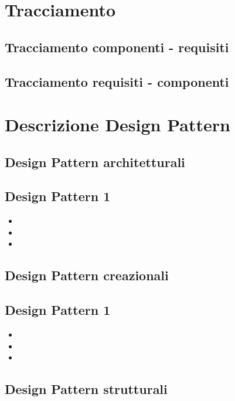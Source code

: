 \newpage
\section{Tracciamento} %
\subsection{Tracciamento componenti - requisiti} %
\subsection{Tracciamento requisiti - componenti} %

\newpage
\appendix
\section{Descrizione Design Pattern} %

\subsection{Design Pattern architetturali} %
\subsection{Design Pattern 1} %
\begin{itemize}
\item {} 
\item {} 
\item {}
\end{itemize}

\subsection{Design Pattern creazionali} %
\subsection{Design Pattern 1} %
\begin{itemize}
\item {} 
\item {} 
\item {}
\end{itemize}

\subsection{Design Pattern strutturali} %
